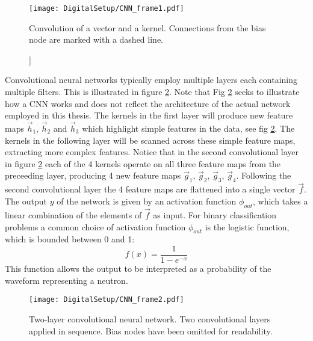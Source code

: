 \documentclass[main.tex]{subfiles}
\begin{document}
\begin{figure}[ht!]
    \centering
        \texttt{[image: DigitalSetup/CNN\_frame1.pdf]}
        \caption[Convolution of a vector and a kernel]]{Convolution of a vector and a kernel. Connections from the bias node are marked with a dashed line.}
    \label{fig:CNN_frame1} 
\end{figure}

Convolutional neural networks typically employ multiple layers each containing multiple filters. This is illustrated in figure \ref{fig:CNN_frame2}. Note that Fig \ref{fig:CNN_frame2} seeks to illustrate how a CNN works and does not reflect the architecture of the actual network employed in this thesis.  The kernels in the first layer will produce new feature maps $\vec h_1$, $\vec h_2$ and $\vec h_3$ which highlight simple features in the data, see fig \ref{fig:CNN_frame2}. The kernels in the following layer will be scanned across these simple feature maps, extracting more complex features. Notice that in the second convolutional layer in figure \ref{fig:CNN_frame2} each of the 4 kernels operate on all three feature maps from the preceeding layer, producing 4 new feature maps $\vec g_1$, $\vec g_2$, $\vec g_3$, $\vec g_4$. Following the second convolutional layer the 4 feature maps are flattened into a single vector $\vec f$. The output $y$ of the network is given by an activation function $\phi_{out}$, which takes a linear combination of the elements of $\vec f$ as input. For binary classification problems a common choice of activation function $\phi_{out}$ is the logistic function, which is bounded between 0 and 1:
\begin{equation}
	f(x) = \frac{1}{1-e^{-x}}
\end{equation}
This function allows the output to be interpreted as a probability of the waveform representing a neutron.

\begin{figure}[ht!]
    \centering
        \texttt{[image: DigitalSetup/CNN\_frame2.pdf]}
        \caption[Two-layer convolutional neural network.]{Two-layer convolutional neural network. Two convolutional layers applied in sequence. Bias nodes have been omitted for readability.}
    \label{fig:CNN_frame2} 
\end{figure}
\end{document}
